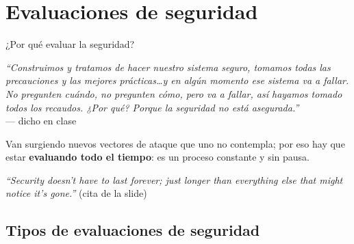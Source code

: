 \documentclass[11pt,a4paper]{article}
\newcommand{\prof}[1]{\par\medskip\noindent\textit{``#1''}\\[-2pt]\hspace*{1em}%
  {\footnotesize\textcolor{black!60}{--- dicho en clase}}\par\medskip\noindent}
\begin{document}
\section{Evaluaciones de seguridad}

\begin{anecbox}{¿Por qué evaluar la seguridad?}
\prof{Construimos y tratamos de hacer nuestro sistema seguro, tomamos todas las precauciones y
las mejores prácticas\dots y en algún momento ese sistema va a fallar. No pregunten cuándo, no
pregunten cómo, pero va a fallar, así hayamos tomado todos los recaudos. ¿Por qué? Porque la
seguridad no está asegurada.} Van surgiendo nuevos vectores de ataque que uno no contempla; por
eso hay que estar \textbf{evaluando todo el tiempo}: es un proceso constante y sin pausa.
\end{anecbox}

\begin{slidebox}
\textit{``Security doesn't have to last forever; just longer than everything else that might
notice it's gone.''} \hfill (cita de la slide)
\end{slidebox}

\subsection{Tipos de evaluaciones de seguridad}
\end{document}
